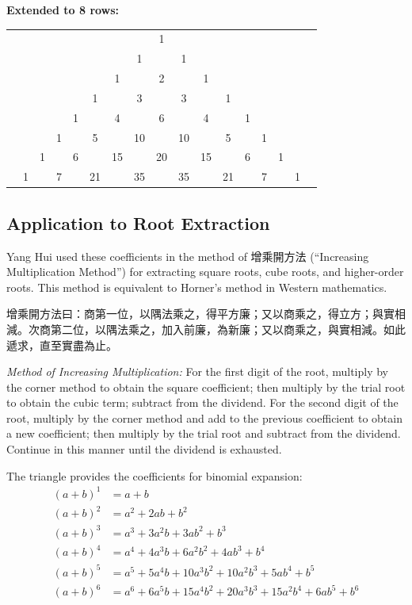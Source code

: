 \documentclass[11pt,a4paper]{article}
\newcommand{\zh}[1]{{#1}}
\newenvironment{chpassage}{%
  \par\medskip
  \begin{center}
  \begin{minipage}{0.95\textwidth}
  \setlength{\parindent}{2em}
  \linespread{1.3}\selectfont
}{%
  \end{minipage}
  \end{center}
  \medskip
}
\begin{document}
\vspace{0.5cm}

\begin{center}
\textbf{Extended to 8 rows:}
\vspace{0.5cm}

\begin{tabular}{ccccccccccccccccc}
 & & & & & & & & 1 & & & & & & & & \\
 & & & & & & & 1 & & 1 & & & & & & & \\
 & & & & & & 1 & & 2 & & 1 & & & & & & \\
 & & & & & 1 & & 3 & & 3 & & 1 & & & & & \\
 & & & & 1 & & 4 & & 6 & & 4 & & 1 & & & & \\
 & & & 1 & & 5 & & 10 & & 10 & & 5 & & 1 & & & \\
 & & 1 & & 6 & & 15 & & 20 & & 15 & & 6 & & 1 & & \\
 & 1 & & 7 & & 21 & & 35 & & 35 & & 21 & & 7 & & 1 & \\
\end{tabular}
\end{center}

\subsection{Application to Root Extraction}

Yang Hui used these coefficients in the method of \zh{增乘開方法}
(``Increasing Multiplication Method'') for extracting square roots, cube
roots, and higher-order roots. This method is equivalent to Horner's method
in Western mathematics.

\begin{chpassage}
\zh{增乘開方法曰：商第一位，以隅法乘之，得平方廉；又以商乘之，得立方；與實相減。次商第二位，以隅法乘之，加入前廉，為新廉；又以商乘之，與實相減。如此遞求，直至實盡為止。}

\medskip
\textit{Method of Increasing Multiplication:} For the first digit of the
root, multiply by the corner method to obtain the square coefficient; then
multiply by the trial root to obtain the cubic term; subtract from the
dividend. For the second digit of the root, multiply by the corner method
and add to the previous coefficient to obtain a new coefficient; then
multiply by the trial root and subtract from the dividend. Continue in this
manner until the dividend is exhausted.
\end{chpassage}

The triangle provides the coefficients for binomial expansion:
\begin{align*}
(a+b)^1 &= a + b \\
(a+b)^2 &= a^2 + 2ab + b^2 \\
(a+b)^3 &= a^3 + 3a^2b + 3ab^2 + b^3 \\
(a+b)^4 &= a^4 + 4a^3b + 6a^2b^2 + 4ab^3 + b^4 \\
(a+b)^5 &= a^5 + 5a^4b + 10a^3b^2 + 10a^2b^3 + 5ab^4 + b^5 \\
(a+b)^6 &= a^6 + 6a^5b + 15a^4b^2 + 20a^3b^3 + 15a^2b^4 + 6ab^5 + b^6
\end{align*}
\end{document}
